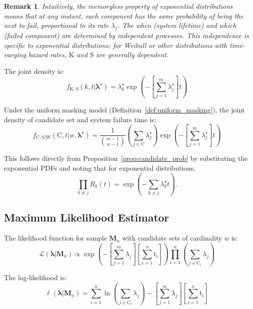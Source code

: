 \documentclass[pdflatex,sn-mathphys-num,Numbered]{sn-jnl}
\newcommand{\RV}[1]{\mathrm{#1}}
\newcommand{\sv}{\RV{S}}           %
\newcommand{\cand}{\RV{C}}         %
\newcommand{\rvcand}{\RV{C}}       %
\newcommand{\ti}{\mathrm{t}}       %
\newcommand{\tparam}[1]{{#1}^{\star}}  %
\newcommand{\likelihood}{\mathcal{L}}
\newcommand{\mfs}{\mathbf{M}_n}
\newcommand{\pdf}{f}
\newcommand{\srv}{R}
\renewcommand{\vec}[1]{\boldsymbol{#1}}
\theoremstyle{thmstyleone}
\theoremstyle{thmstylethree}
\theoremstyle{thmstyletwo}
\newtheorem{remark}[theorem]{Remark}
\begin{document}
\begin{remark}
Intuitively, the memoryless property of exponential distributions means that at any instant, each component has the same probability of being the next to fail, proportional to its rate $\lambda_j$. The \emph{when} (system lifetime) and \emph{which} (failed component) are determined by independent processes. This independence is specific to exponential distributions; for Weibull or other distributions with time-varying hazard rates, $\RV{K}$ and $\sv$ are generally dependent.
\end{remark}

The joint density is:
\begin{equation}
\label{eq:expo_joint}
\pdf_{\RV{K}, \sv}(k, t | \tparam{\vec{\lambda}}) = \tparam{\lambda}_k \exp\left(-\left[\sum_{j=1}^{m} \tparam{\lambda}_j\right] t\right)
\end{equation}

Under the uniform masking model (Definition~\ref{def:uniform_masking}), the joint density of candidate set and system failure time is:
\begin{equation}
\label{eq:expo_masked_joint}
\pdf_{\rvcand, \sv | \RV{W}}(\cand, t | w, \tparam{\vec{\lambda}}) = \frac{1}{\binom{m-1}{w-1}} \left(\sum_{j \in \cand} \tparam{\lambda}_j\right) \exp\left(-\left[\sum_{j=1}^{m} \tparam{\lambda}_j\right] t\right)
\end{equation}

This follows directly from Proposition~\ref{prop:candidate_prob} by substituting the exponential PDFs and noting that for exponential distributions,
\[
\prod_{k \neq j} \srv_k(t) = \exp\!\left(-\sum_{k \neq j} \tparam{\lambda}_k t\right).
\]

\subsection{Maximum Likelihood Estimator}

The likelihood function for sample $\mfs$ with candidate sets of cardinality $w$ is:
\begin{equation}
\label{eq:expo_likelihood}
\likelihood(\vec{\lambda} | \mfs) \propto \exp\left(-\left[\sum_{j=1}^{m} \lambda_j\right] \left[\sum_{i=1}^{n} \ti_i\right]\right) \prod_{i=1}^{n} \left(\sum_{j \in \cand_i} \lambda_j\right)
\end{equation}

The log-likelihood is:
\begin{equation}
\label{eq:expo_loglik}
\ell(\vec{\lambda} | \mfs) = \sum_{i=1}^{n} \ln\left(\sum_{j \in \cand_i} \lambda_j\right) - \left[\sum_{j=1}^{m} \lambda_j\right] \left[\sum_{i=1}^{n} \ti_i\right]
\end{equation}
\end{document}
